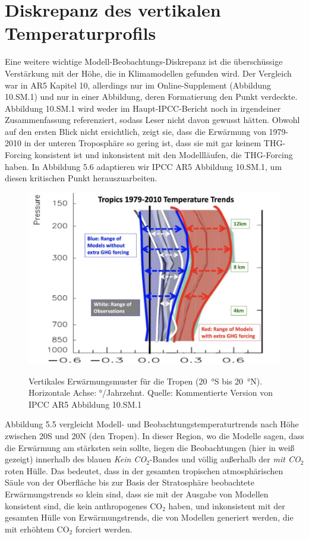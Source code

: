 \documentclass[12pt,paper=a4,DIV=12,parskip=never,chapterprefix=false,headings=standardclasses]{scrreprt}
\begin{document}
\section{Diskrepanz des vertikalen Temperaturprofils}
Eine weitere wichtige Modell-Beobachtungs-Diskrepanz ist die überschüssige Verstärkung mit der Höhe, die in Klimamodellen gefunden wird. Der Vergleich war in AR5 Kapitel 10, allerdings nur im Online-Supplement (Abbildung 10.SM.1) und nur in einer Abbildung, deren Formatierung den Punkt verdeckte. Abbildung 10.SM.1 wird weder im Haupt-IPCC-Bericht noch in irgendeiner Zusammenfassung referenziert, sodass Leser nicht davon gewusst hätten. Obwohl auf den ersten Blick nicht ersichtlich, zeigt sie, dass die Erwärmung von 1979-2010 in der unteren Troposphäre so gering ist, dass sie mit gar keinem THG-Forcing konsistent ist und inkonsistent mit den Modellläufen, die THG-Forcing haben. In Abbildung 5.6 adaptieren wir IPCC AR5 Abbildung 10.SM.1, um diesen kritischen Punkt herauszuarbeiten.

\begin{figure}[H]
\begin{center}
\includegraphics[width=1.0\textwidth]{bilder/bilderKlima-0029.jpg}\\[1cm]
\end{center}
\caption{Vertikales Erwärmungsmuster für die Tropen (\SI{20}{\degree}S bis \SI{20}{\degree}N). Horizontale Achse:
\si{\degree}/Jahrzehnt. Quelle: Kommentierte Version von IPCC AR5 Abbildung 10.SM.1}
\end{figure}

Abbildung 5.5 vergleicht Modell- und Beobachtungstemperaturtrends nach Höhe zwischen 20S und 20N (den Tropen). In dieser Region, wo die Modelle sagen, dass die Erwärmung am stärksten sein sollte, liegen die Beobachtungen (hier in weiß gezeigt) innerhalb des blauen \emph{Kein CO$_2$}-Bandes und völlig außerhalb der \emph{mit CO$_2$} roten Hülle. Das bedeutet, dass in der gesamten tropischen atmosphärischen Säule von der Oberfläche bis zur Basis der Stratosphäre beobachtete Erwärmungstrends so klein sind, dass sie mit der Ausgabe von Modellen konsistent sind, die kein anthropogenes CO$_2$ haben, und inkonsistent mit der gesamten Hülle von Erwärmungstrends, die von Modellen generiert werden, die mit erhöhtem CO$_2$ forciert werden.
\end{document}
